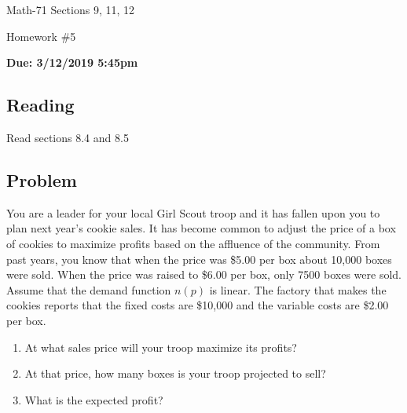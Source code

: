 \documentclass[letterpaper,12pt,fleqn]{article}
\begin{document}
\begin{center}
  \large
  Math-71 Sections 9, 11, 12

  \Large
  Homework \#5

  \large
  \textbf{Due: 3/12/2019 5:45pm}
\end{center}

\subsection*{Reading}

Read sections 8.4 and 8.5

\subsection*{Problem}

You are a leader for your local Girl Scout troop and it has fallen upon you to plan next year's cookie sales.  It has become
common to adjust the price of a box of cookies to maximize profits based on the affluence of the community.  From past years,
you know that when the price was \$5.00 per box about 10,000 boxes were sold.  When the price was raised to \$6.00 per box,
only 7500 boxes were sold.  Assume that the demand function \(n(p)\) is linear.  The factory that makes the cookies reports
that the fixed costs are \$10,000 and the variable costs are \$2.00 per box.
\begin{enumerate}
\item At what sales price will your troop maximize its profits?
\item At that price, how many boxes is your troop projected to sell?
\item What is the expected profit?
\end{enumerate}
\end{document}
